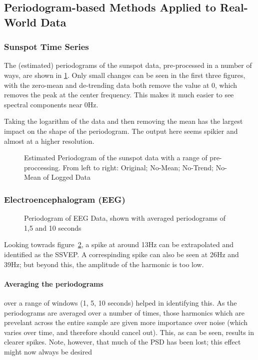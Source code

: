 \documentclass[main.tex]{subfiles}
\begin{document}
\subsection{Periodogram-based Methods Applied to Real-World Data}



\subsubsection{Sunspot Time Series}

The (estimated) periodograms of the sunspot data, pre-processed in a number of ways, are shown in \ref{fig:q1_4_a}. Only small changes can be seen in the first three figures, with the zero-mean and de-trending data both remove the value at 0, which removes the peak at the center frequency. This makes it much easier to see spectral components near 0Hz.


Taking the logarithm of the data and then removing the mean has the largest impact on the shape of the periodogram. The output here seems spikier and almost at a higher resolution. 

\begin{figure}[H]
	\centering 
	\resizebox{\textwidth}{!}{}
	\caption{Estimated Periodogram of the sunspot data with a range of pre-proccessing. From left to right: Original; No-Mean; No-Trend; No-Mean of Logged Data}
	\label{fig:q1_4_a}
\end{figure}


\subsubsection{Electroencephalogram (EEG)}



\begin{figure}[H]
	\centering 
	\resizebox{\textwidth}{!}{}
	\caption{Periodogram of EEG Data, shown with averaged periodograms of 1,5 and 10 seconds}
	\label{fig:q1_4_b}
\end{figure}

Looking towrads figure~\ref{fig:q1_4_b}, a spike at around 13Hz can be extrapolated and identified as the SSVEP. A correspinding spike can also be seen at 26Hz and 39Hz; but beyond this, the amplitude of the harmonic is too low.

\paragraph{Averaging the periodograms} over a range of windows (1, 5, 10 seconds) helped in identifying this. As the periodograms are averaged over a number of times, those harmonics which are prevelant across the entire sample are given more importance over noise (which varies over time, and therefore should cancel out). This, as can be seen, results in clearer spikes. Note, however, that much of the PSD has been lost; this effect might now always be desired
\end{document}
